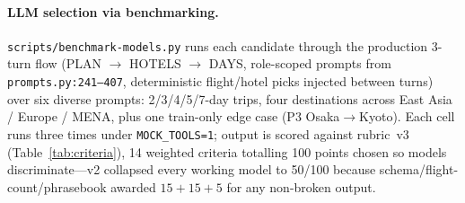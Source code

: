 \documentclass{article}
\begin{document}
\paragraph{LLM selection via benchmarking.}
\texttt{scripts/benchmark-models.py} runs each candidate through the
production 3-turn flow (PLAN $\to$ HOTELS $\to$ DAYS, role-scoped
prompts from \texttt{prompts.py:241--407}, deterministic flight/hotel
picks injected between turns) over six diverse prompts: 2/3/4/5/7-day
trips, four destinations across East Asia / Europe / MENA, plus one
train-only edge case (P3 Osaka$\to$Kyoto). Each cell runs three times
under \texttt{MOCK\_TOOLS=1}; output is scored against rubric~v3
(Table~\ref{tab:criteria}), 14 weighted criteria totalling 100 points
chosen so models discriminate---v2 collapsed every working model to
50/100 because schema/flight-count/phrasebook awarded
$15{+}15{+}5$ for any non-broken output.
\end{document}
